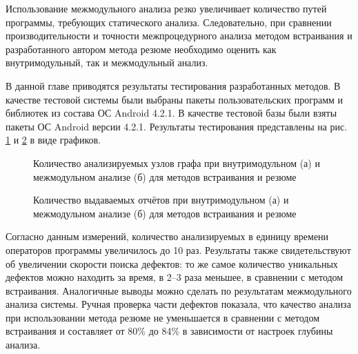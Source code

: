 Использование межмодульного анализа резко увеличивает количество  путей программы, требующих статического анализа. Следовательно, при сравнении производительности и точности межпроцедурного анализа методом встраивания и разработанного автором метода резюме необходимо оценить как внутримодульный, так и межмодульный анализ.

В данной главе приводятся результаты тестирования разработанных методов. В качестве тестовой системы были выбраны пакеты пользовательских программ и библиотек из состава ОС Android 4.2.1. В качестве тестовой базы были взяты пакеты ОС Android версии 4.2.1. Результаты тестирования представлены на рис. \ref{img:nodes} и \ref{img:defects} в виде графиков.


\begin{figure}[ht]
  \begin{minipage}[ht]{0.49\linewidth}
  \end{minipage}
  \hfill
  \begin{minipage}[ht]{0.49\linewidth}
  \end{minipage}
  \caption{Количество анализируемых узлов графа при внутримодульном (а) и межмодульном анализе (б) для методов встраивания и резюме}
  \label{img:nodes}  
\end{figure}

\begin{figure}[ht]
  \begin{minipage}[ht]{0.49\linewidth}
  \end{minipage}
  \hfill
  \begin{minipage}[ht]{0.49\linewidth}
  \end{minipage}
  \caption{Количество выдаваемых отчётов при внутримодульном (а) и межмодульном анализе (б) для методов встраивания и резюме}
  \label{img:defects}  
\end{figure}

Согласно данным измерений, количество анализируемых в единицу времени операторов программы увеличилось до 10 раз. Результаты также свидетельствуют об увеличении скорости поиска дефектов: то же самое количество уникальных дефектов можно находить за время, в 2--3 раза меньшее, в сравнении с методом встраивания. Аналогичные выводы можно сделать по результатам межмодульного анализа системы. Ручная проверка части дефектов показала, что качество анализа при использовании метода резюме не уменьшается в сравнении с методом встраивания и составляет от 80\% до 84\% в зависимости от настроек глубины анализа.


